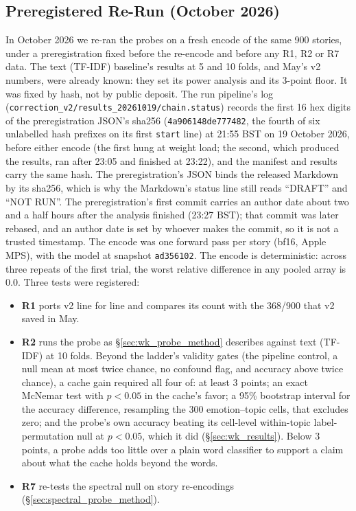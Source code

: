 \documentclass[11pt,a4paper]{article}
\begin{document}
\subsection{Preregistered Re-Run (October 2026)}
\label{sec:rerun_method}

In October 2026 we re-ran the probes on a fresh encode of the same 900 stories, under a preregistration fixed before the re-encode and before any R1, R2 or R7 data. The text (TF-IDF) baseline's results at 5 and 10 folds, and May's v2 numbers, were already known: they set its power analysis and its 3-point floor. It was fixed by hash, not by public deposit. The run pipeline's log (\texttt{correction\_v2/results\_20261019/chain.status}) records the first 16 hex digits of the preregistration JSON's sha256 (\texttt{4a906148de777482}, the fourth of six unlabelled hash prefixes on its first \texttt{start} line) at 21:55 BST on 19 October 2026, before either encode (the first hung at weight load; the second, which produced the results, ran after 23:05 and finished at 23:22), and the manifest and results carry the same hash. The preregistration's JSON binds the released Markdown by its sha256, which is why the Markdown's status line still reads ``DRAFT'' and ``NOT RUN''. The preregistration's first commit carries an author date about two and a half hours after the analysis finished (23:27 BST); that commit was later rebased, and an author date is set by whoever makes the commit, so it is not a trusted timestamp. The encode was one forward pass per story (bf16, Apple MPS), with the model at snapshot \texttt{ad356102}. The encode is deterministic: across three repeats of the first trial, the worst relative difference in any pooled array is 0.0. Three tests were registered:
\begin{itemize}[nosep]
    \item \textbf{R1} ports v2 line for line and compares its count with the 368/900 that v2 saved in May.
    \item \textbf{R2} runs the probe as \S\ref{sec:wk_probe_method} describes against text (TF-IDF) at 10 folds. Beyond the ladder's validity gates (the pipeline control, a null mean at most twice chance, no confound flag, and accuracy above twice chance), a cache gain required all four of: at least 3 points; an exact McNemar test with $p < 0.05$ in the cache's favor; a 95\% bootstrap interval for the accuracy difference, resampling the 300 emotion--topic cells, that excludes zero; and the probe's own accuracy beating its cell-level within-topic label-permutation null at $p < 0.05$, which it did (\S\ref{sec:wk_results}). Below 3 points, a probe adds too little over a plain word classifier to support a claim about what the cache holds beyond the words.
    \item \textbf{R7} re-tests the spectral null on story re-encodings (\S\ref{sec:spectral_probe_method}).
\end{itemize}
\end{document}
